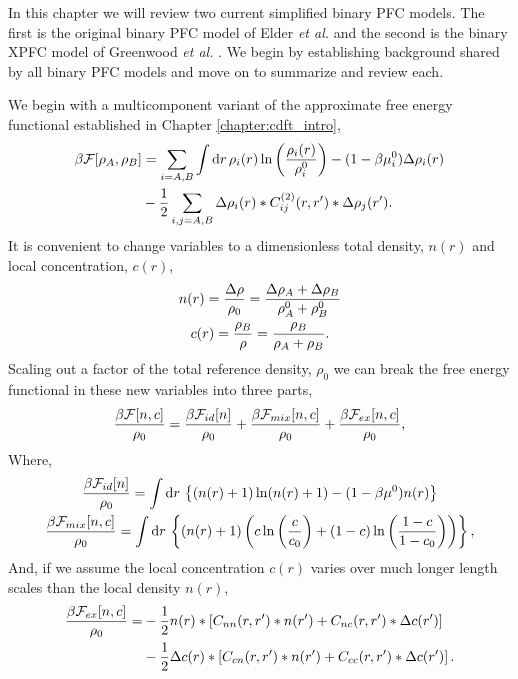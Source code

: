 \label{chapter:binary}

In this chapter we will review two current simplified binary PFC models.
The first is the original binary PFC model of Elder \textit{et al.}
\cite{ELDER07} and the second is the binary XPFC model of Greenwood \textit{et
al.} \cite{GREENWOOD11_BINARY}. We begin by establishing background shared by 
all binary PFC models and move on to summarize and review each.

We begin with a multicomponent variant of the approximate
free energy functional established in Chapter \ref{chapter:cdft_intro},
%
\begin{align}
    \label{binary_cdft_free_energy}
    \beta\mathcal{F}[\rho_A, \rho_B] &= \sum_{i=A, B} \int \mathrm{d}r 
        \,\rho_i(r) \ln\left(\frac{\rho_i(r)}{\rho_i^0}\right) 
        - (1 - \beta\mu_i^0)\Delta\rho_i(r)\\
    &- \frac{1}{2} \sum_{i,j=A, B} \Delta\rho_i(r) \ast C^{(2)}_{ij}(r, r^\prime) 
        \ast \Delta\rho_j(r^\prime). \nonumber
\end{align}
%
It is convenient to change variables to a dimensionless total density, $n(r)$
and local concentration, $c(r)$,
%
\begin{gather}
    n(r) = \frac{\Delta \rho}{\rho_0} = \frac{\Delta\rho_A + \Delta\rho_B}{\rho_A^0 + \rho_B^0} \\
    c(r) = \frac{\rho_B}{\rho} = \frac{\rho_B}{\rho_A + \rho_B}.
\end{gather}
%
Scaling out a factor of the total reference density, $\rho_0$ we can break the
free energy functional in these new variables into three parts,
%
\begin{equation}
    \label{binary_total_free_energy}
    \frac{\beta\mathcal{F}[n, c]}{\rho_0} = \frac{\beta\mathcal{F}_{id}[n]}{\rho_0} 
        + \frac{\beta\mathcal{F}_{mix}[n, c]}{\rho_0}
        + \frac{\beta\mathcal{F}_{ex}[n, c]}{\rho_0},
\end{equation}
%
Where,
%
\begin{gather}
    \label{binary_ideal}
    \frac{\beta\mathcal{F}_{id}[n]}{\rho_0} =
        \int \mathrm{d}r \,\left\lbrace (n(r) + 1)\ln(n(r) + 1) 
        - (1 - \beta\mu^0)n(r) \right\rbrace \\
    \label{binary_mixing}
    \frac{\beta\mathcal{F}_{mix}[n, c]}{\rho_0} =
        \int \mathrm{d}r \,\left\lbrace (n(r) + 1)\left( 
            c\ln\left(\frac{c}{c_0}\right) + (1-c)\ln\left(\frac{1-c}{1-c_0}\right) \right)\right\rbrace, 
\end{gather}
%
And, if we assume the local concentration $c(r)$ varies over much longer length
scales than the local density $n(r)$,
%
\begin{align}
    \label{binary_excess}
    \frac{\beta\mathcal{F}_{ex}[n, c]}{\rho_0}
        = &-\frac{1}{2} n(r) \ast \left[ 
            C_{nn}(r, r^\prime) \ast n(r^\prime) 
          + C_{nc}(r, r^\prime) \ast \Delta c(r^\prime)\right] \\
        &-\frac{1}{2} \Delta c(r) \ast \left[
            C_{cn}(r, r^\prime) \ast n(r^\prime) 
          + C_{cc}(r, r^\prime) \ast \Delta c(r^\prime)\right]. \nonumber
\end{align}
